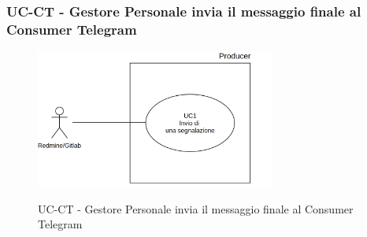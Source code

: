 \subsubsection{UC\theuccount-CT - Gestore Personale invia il messaggio finale al Consumer Telegram}
	\begin{figure}[H]
		\centering
		\includegraphics[width=0.7\textwidth]{img/UC1.png}\\
		\caption{UC\theuccount-CT - Gestore Personale invia il messaggio finale al Consumer Telegram}
	\end{figure}
